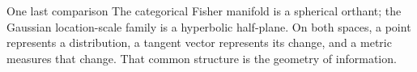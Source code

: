 \documentclass[aspectratio=169,11pt]{beamer}
\begin{document}
\begin{frame}{One last comparison}
The categorical Fisher manifold is a spherical orthant;
the Gaussian location-scale family is a hyperbolic half-plane.
\vspace{.48cm}
On both spaces, a point represents a distribution,
a tangent vector represents its change,
and a metric measures that change.
\vspace{.48cm}
That common structure is the geometry of information.
\end{frame}
\end{document}
